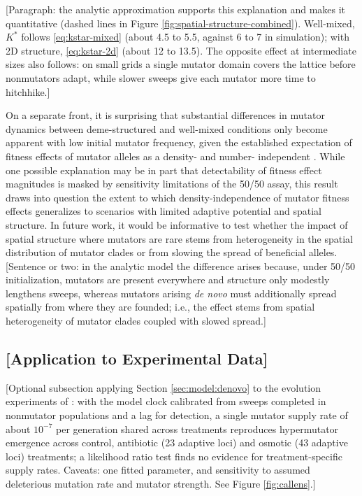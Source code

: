 [Paragraph: the analytic approximation supports this explanation and makes it quantitative (dashed lines in Figure \ref{fig:spatial-structure-combined}). Well-mixed, $K^*$ follows \cref{eq:kstar-mixed} (about 4.5 to 5.5, against 6 to 7 in simulation); with 2D structure, \cref{eq:kstar-2d} (about 12 to 13.5). The opposite effect at intermediate sizes also follows: on small grids a single mutator domain covers the lattice before nonmutators adapt, while slower sweeps give each mutator more time to hitchhike.]

On a separate front, it is surprising that substantial differences in mutator dynamics between deme-structured and well-mixed conditions only become apparent with low initial mutator frequency, given the established expectation of fitness effects of mutator alleles as a density- and number- independent \citep{raynes2019selection}.
While one possible explanation may be in part that detectability of fitness effect magnitudes is masked by sensitivity limitations of the 50/50 assay, this result draws into question the extent to which density-independence of mutator fitness effects generalizes to scenarios with limited adaptive potential and spatial structure.
In future work, it would be informative to test whether the impact of spatial structure where mutators are rare stems from heterogeneity in the spatial distribution of mutator clades or from slowing the spread of beneficial alleles.
[Sentence or two: in the analytic model the difference arises because, under 50/50 initialization, mutators are present everywhere and structure only modestly lengthens sweeps, whereas mutators arising \textit{de novo} must additionally spread spatially from where they are founded; i.e., the effect stems from spatial heterogeneity of mutator clades coupled with slowed spread.]

\subsection{[Application to Experimental Data]}
\label{sec:callens}

[Optional subsection applying Section \ref{sec:model:denovo} to the evolution experiments of \citet{callens2023hypermutator}: with the model clock calibrated from sweeps completed in nonmutator populations and a lag for detection, a single mutator supply rate of about $10^{-7}$ per generation shared across treatments reproduces hypermutator emergence across control, antibiotic (23 adaptive loci) and osmotic (43 adaptive loci) treatments; a likelihood ratio test finds no evidence for treatment-specific supply rates. Caveats: one fitted parameter, and sensitivity to assumed deleterious mutation rate and mutator strength. See Figure \ref{fig:callens}.]


